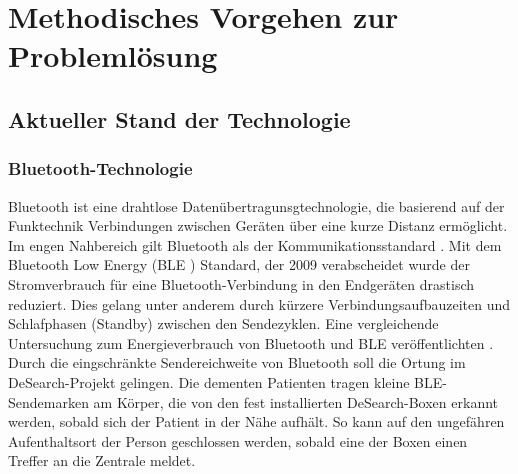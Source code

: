 \section{Methodisches Vorgehen zur Problemlösung}

\subsection{Aktueller Stand der Technologie}

\subsubsection{Bluetooth-Technologie}\label{sssec:BLE}
Bluetooth ist eine drahtlose Datenübertragunsgtechnologie, die basierend auf der Funktechnik Verbindungen zwischen Geräten über eine kurze Distanz ermöglicht. Im engen Nahbereich gilt Bluetooth als der Kommunikationsstandard \citep[Vgl.][S. 133]{mobil-sicher}. Mit dem Bluetooth Low Energy (BLE ) Standard, der 2009 verabscheidet wurde der Stromverbrauch für eine Bluetooth-Verbindung in den Endgeräten drastisch reduziert. Dies gelang unter anderem durch kürzere Verbindungsaufbauzeiten und Schlafphasen (Standby) zwischen den Sendezyklen. Eine vergleichende Untersuchung zum Energieverbrauch von Bluetooth und BLE veröffentlichten \cite{ble-energy}. Durch die eingschränkte Sendereichweite von Bluetooth soll die Ortung im DeSearch-Projekt gelingen. Die dementen Patienten tragen kleine BLE-Sendemarken am Körper, die von den fest installierten DeSearch-Boxen erkannt werden, sobald sich der Patient in der Nähe aufhält. So kann auf den ungefähren Aufenthaltsort der Person geschlossen werden, sobald eine der Boxen einen Treffer an die Zentrale meldet. 
